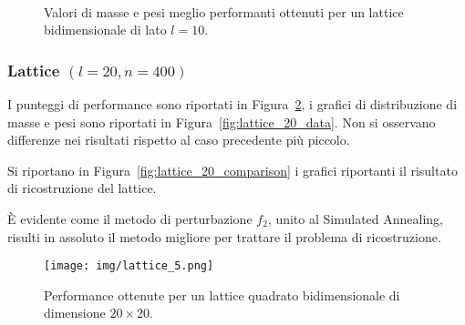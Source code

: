 \documentclass[10pt,a4paper]{article}
\begin{document}
\begin{figure}[p]
    \centering
    \\
    \caption{Valori di masse e pesi meglio performanti ottenuti per un lattice bidimensionale di lato \(l=10\).}\label{fig:lattice_10_data}
\end{figure}

\subsubsection{Lattice \((l = 20, n = 400)\)}

I punteggi di performance sono riportati in Figura~\ref{fig:lattice_20_performance}, i grafici di distribuzione di masse e pesi sono riportati in Figura~\ref{fig:lattice_20_data}.
Non si osservano differenze nei risultati rispetto al caso precedente più piccolo.

Si riportano in Figura~\ref{fig:lattice_20_comparison} i grafici riportanti il risultato di ricostruzione del lattice.

È evidente come il metodo di perturbazione \(f_2\), unito al Simulated Annealing, risulti in assoluto il metodo migliore per trattare il problema di ricostruzione.

\begin{figure}[p]
    \centering
    \texttt{[image: img/lattice\_5.png]}
    \caption{Performance ottenute per un lattice quadrato bidimensionale di dimensione \(20 \times 20\).}\label{fig:lattice_20_performance}
\end{figure}
\end{document}
